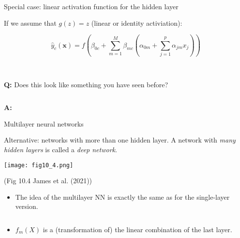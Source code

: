\documentclass[
  10pt,
  ignorenonframetext,
]{beamer}
\providecommand{\tightlist}{%
  \setlength{\itemsep}{0pt}\setlength{\parskip}{0pt}}
\begin{document}
\begin{frame}
\begin{block}{Special case: linear activation function for the hidden
layer}
\protect\hypertarget{special-case-linear-activation-function-for-the-hidden-layer}{}
\(~\)

If we assume that \(g(z)=z\) (linear or identity activiation):

\[
\hat{y}_c({\boldsymbol x})= f(\beta_{0c}+\sum_{m=1}^M \beta_{mc}(\alpha_{0m}+\sum_{j=1}^p \alpha_{jm}x_{j}))
\]

\(~\) \(~\)

\textbf{Q:} Does this look like something you have seen before?

\(~\)

\textbf{A:}
\end{block}
\end{frame}

\begin{frame}
\begin{block}{Multilayer neural networks}
\protect\hypertarget{multilayer-neural-networks}{}
\(~\)

Alternative: networks with more than one hidden layer. A network with
\emph{many hidden layers} is called a \emph{deep network}.

\centering

\texttt{[image: fig10\_4.png]}

\scriptsize

(Fig 10.4 James et al. (2021))
\end{block}
\end{frame}

\begin{frame}
\begin{itemize}
\tightlist
\item
  The idea of the multilayer NN is exactly the same as for the
  single-layer version.
\end{itemize}

\(~\)

\begin{itemize}
\tightlist
\item
  \(f_m(X)\) is a (transformation of) the linear combination of the last
  layer.
\end{itemize}
\end{frame}
\end{document}
